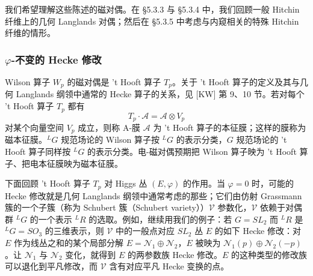 我们希望理解这些陈述的磁对偶。在 §5.3.3 与 §5.3.4 中，我们回顾一般 Hitchin 纤维上的几何 Langlands 对偶；然后在 §5.3.5 中考虑与内窥相关的特殊 Hitchin 纤维的情形。

\subsubsection{\texorpdfstring{$\varphi$}{φ}-不变的 Hecke 修改}

Wilson 算子 $W_p$ 的磁对偶是 't Hooft 算子 $T_p$。关于 't Hooft 算子的定义及其与几何 Langlands 纲领中通常的 Hecke 算子的关系，见 [KW] 第 9、10 节。若对每个 't Hooft 算子 $T_p$ 都有
\begin{equation}\tag{5.25}
T_p\cdot\mathcal{A}=\mathcal{A}\otimes V_p
\end{equation}
对某个向量空间 $V_p$ 成立，则称 A-膜 $\mathcal{A}$ 为 't Hooft 算子的本征膜；这样的膜称为磁本征膜。${}^{L}G$ 规范场论的 Wilson 算子按 ${}^{L}G$ 的表示分类，$G$ 规范场论的 't Hooft 算子同样按 ${}^{L}G$ 的表示分类。电-磁对偶预期把 Wilson 算子映为 't Hooft 算子、把电本征膜映为磁本征膜。

下面回顾 't Hooft 算子 $T_p$ 对 Higgs 丛 $(E,\varphi)$ 的作用。当 $\varphi=0$ 时，可能的 Hecke 修改就是几何 Langlands 纲领中通常考虑的那些；它们由仿射 Grassmann 簇的一个子簇（称为 Schubert 簇（Schubert variety））$\mathcal{V}$ 参数化，$\mathcal{V}$ 依赖于对偶群 ${}^{L}G$ 的一个表示 ${}^{L}R$ 的选取。例如，继续用我们的例子：若 $G=SL_2$ 而 ${}^{L}R$ 是 ${}^{L}G=SO_3$ 的三维表示，则 $\mathcal{V}$ 中的一般点对应 $SL_2$ 丛 $E$ 的如下 Hecke 修改：对 $E$ 作为线丛之和的某个局部分解 $E=\mathcal{N}_1\oplus\mathcal{N}_2$，$E$ 被映为 $\mathcal{N}_1(p)\oplus\mathcal{N}_2(-p)$。让 $\mathcal{N}_1$ 与 $\mathcal{N}_2$ 变化，就得到 $E$ 的两参数族 Hecke 修改。$E$ 的这种类型的修改族可以退化到平凡修改，而 $\mathcal{V}$ 含有对应平凡 Hecke 变换的点。


